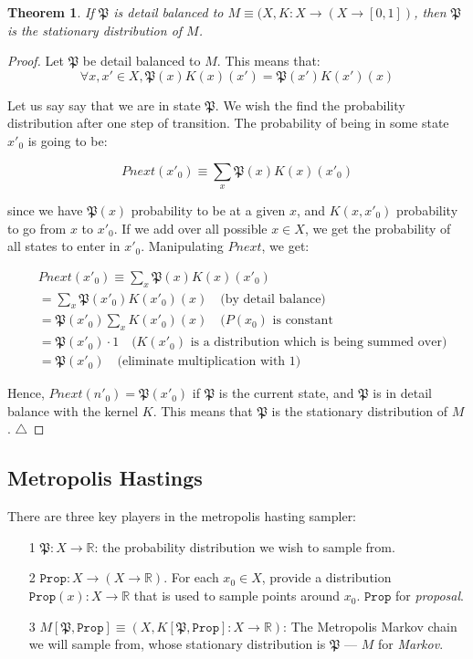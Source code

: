 \documentclass[titlepage]{article}
\newcommand{\R}{\mathbb{R}}
\renewcommand{\P}{\mathfrak{P}}
\newcommand{\Prop}{\texttt{Prop}}
\newcommand{\qed}{\ensuremath{\triangle}}
\newtheorem{theorem}{Theorem}
\newtheorem{proof}{Proof}[theorem]
\begin{document}
\begin{theorem}
If $\P$ is detail balanced to $M \equiv (X, K: X \rightarrow (X \rightarrow [0, 1])$,
then $\P$ is the stationary distribution of $M$.
\end{theorem}
\begin{proof}
Let $\P$ be detail balanced to $M$. This means that:
$$
\forall x, x' \in X, \P(x) K(x)(x') = \P(x') K(x')(x)
$$

Let us say say that we are in state $\P$. We wish the find the probability
distribution after one step of transition. The probability of being
in some state $x'_0$ is going to be:

$$
Pnext(x'_0) \equiv \sum_x \P(x) K(x)(x'_0)
$$

since we have $\P(x)$ probability to be at a given $x$, and
$K(x, x'_0)$  probability to go from $x$ to $x'_0$. If we add over all possible
$x \in X$, we get the probability of all states to enter in $x'_0$.
Manipulating $Pnext$, we get:

\begin{align*}
&Pnext(x'_0) \equiv \sum_x \P(x) K(x)(x'_0) \\
&= \sum_x \P(x'_0) K(x'_0)(x) \quad \text{(by detail balance)} \\
&= \P(x'_0) \sum_x K(x'_0)(x) \quad \text{($P(x_0)$ is constant} \\
&= \P(x'_0) \cdot 1 \quad \text{($K(x'_0)$ is a distribution which is being summed over)} \\
&= \P(x'_0) \quad \text{(eliminate multiplication with 1)}
\end{align*}

Hence, $Pnext(n'_0) = \P(x'_0)$ if $\P$ is the current state, and $\P$
is in detail balance with the kernel $K$.
This means that $\P$ is the stationary distribution of $M$.
\qed
\end{proof}

\subsection{Metropolis Hastings}

There are three key players in the metropolis hasting sampler:
\begin{itemize}
    \item [1] $\P: X \rightarrow \R$: the probability distribution we wish to sample from.
    \item[2] $\Prop: X \rightarrow (X \rightarrow \R)$. For each $x_0 \in X$,
        provide a distribution $\Prop(x): X \rightarrow \R$ that is used to
        sample points around $x_0$.  $\Prop$ for \emph{proposal}.
    \item [3] $M[\P, \Prop] \equiv (X, K[\P, \Prop]: X \rightarrow \R)$: The
        Metropolis Markov chain we will sample from, whose stationary distribution is $\P$ ---
        $M$ for \emph{Markov}.
\end{itemize}
\end{document}
